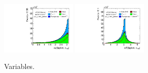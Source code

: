 \begin{figure}[tp]
  \includegraphics[width=0.32\textwidth]{figures/presel/taulep-dphi}
  \includegraphics[width=0.32\textwidth]{figures/presel/taulep-dR}
  \caption{Variables.}
  \label{fig:stategy-presel-1}
\end{figure}

\clearpage

